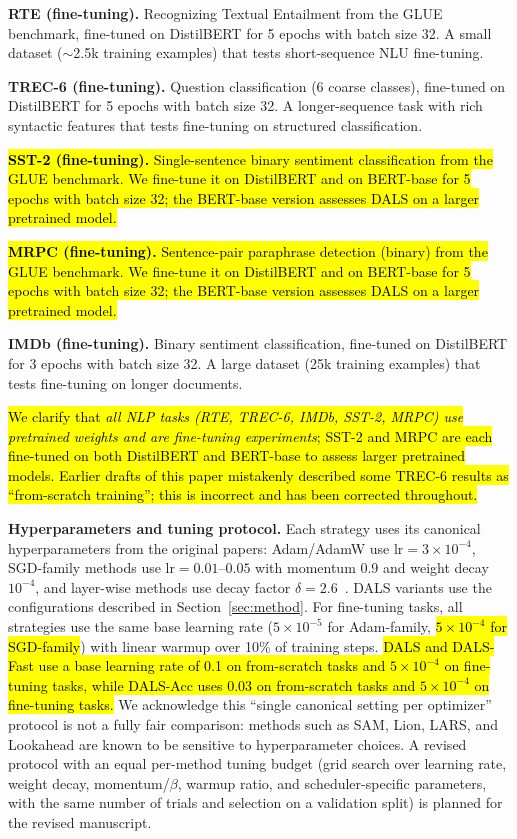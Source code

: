 \documentclass[a4paper,fleqn]{cas-dc}
\begin{document}
\textbf{RTE (fine-tuning).} Recognizing Textual Entailment from the GLUE benchmark, fine-tuned on DistilBERT for 5 epochs with batch size 32. A small dataset ($\sim$2.5k training examples) that tests short-sequence NLU fine-tuning.

\textbf{TREC-6 (fine-tuning).} Question classification (6 coarse classes), fine-tuned on DistilBERT for 5 epochs with batch size 32. A longer-sequence task with rich syntactic features that tests fine-tuning on structured classification.

\hl{\textbf{SST-2 (fine-tuning).} Single-sentence binary sentiment classification from the GLUE benchmark. We fine-tune it on DistilBERT and on BERT-base for 5 epochs with batch size 32; the BERT-base version assesses DALS on a larger pretrained model.}

\hl{\textbf{MRPC (fine-tuning).} Sentence-pair paraphrase detection (binary) from the GLUE benchmark. We fine-tune it on DistilBERT and on BERT-base for 5 epochs with batch size 32; the BERT-base version assesses DALS on a larger pretrained model.}

\textbf{IMDb (fine-tuning).} Binary sentiment classification, fine-tuned on DistilBERT for 3 epochs with batch size 32. A large dataset (25k training examples) that tests fine-tuning on longer documents.

\hl{We clarify that \emph{all NLP tasks (RTE, TREC-6, IMDb, SST-2, MRPC) use pretrained weights and are fine-tuning experiments}; SST-2 and MRPC are each fine-tuned on both DistilBERT and BERT-base to assess larger pretrained models. Earlier drafts of this paper mistakenly described some TREC-6 results as ``from-scratch training''; this is incorrect and has been corrected throughout.}

\textbf{Hyperparameters and tuning protocol.}\label{sec:hp_protocol} Each strategy uses its canonical hyperparameters from the original papers: Adam/AdamW use $\text{lr}=3\times10^{-4}$, SGD-family methods use $\text{lr}=0.01$--$0.05$ with momentum 0.9 and weight decay $10^{-4}$, and layer-wise methods use decay factor $\delta=2.6$~\citet{howard2018ulmfit}. DALS variants use the configurations described in Section~\ref{sec:method}. For fine-tuning tasks, all strategies use the same base learning rate ($5\times10^{-5}$ for Adam-family, \hl{$5\times10^{-4}$ for SGD-family}) with linear warmup over 10\% of training steps. \hl{DALS and DALS-Fast use a base learning rate of 0.1 on from-scratch tasks and $5\times10^{-4}$ on fine-tuning tasks, while DALS-Acc uses 0.03 on from-scratch tasks and $5\times10^{-4}$ on fine-tuning tasks.} We acknowledge this ``single canonical setting per optimizer'' protocol is not a fully fair comparison: methods such as SAM, Lion, LARS, and Lookahead are known to be sensitive to hyperparameter choices. A revised protocol with an equal per-method tuning budget (grid search over learning rate, weight decay, momentum/$\beta$, warmup ratio, and scheduler-specific parameters, with the same number of trials and selection on a validation split) is planned for the revised manuscript.
\end{document}
